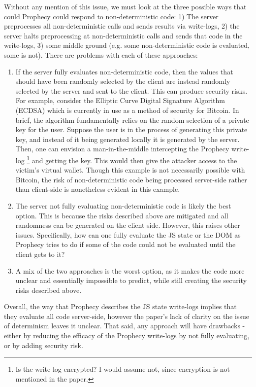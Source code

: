 \documentclass[10pt,letterpaper]{article}
\begin{document}
\begin{multicols*}{2}[]
            Without any mention of this issue, we must look at the three possible ways that could Prophecy could respond to non-deterministic code: 1) The server preprocesses all non-deterministic calls and sends results via write-logs, 2) the server halts preprocessing at non-deterministic calls and sends that code in the write-logs, 3) some middle ground (e.g. some non-deterministic code is evaluated, some is not). There are problems with each of these approaches:
            \begin{enumerate}
                \item If the server fully evaluates non-deterministic code, then the values that should have been randomly selected by the client are instead randomly selected by the server and sent to the client. This can produce security risks. For example, consider the Elliptic Curve Digital Signature Algorithm (ECDSA) which is currently in use as a method of security for Bitcoin. In brief, the algorithm fundamentally relies on the random selection of a private key for the user. Suppose the user is in the process of generating this private key, and instead of it being generated locally it is generated by the server. Then, one can envision a man-in-the-middle intercepting the Prophecy write-log \footnote{Is the write log encrypted? I would assume not, since encryption is not mentioned in the paper.} and getting the key. This would then give the attacker access to the victim's virtual wallet. Though this example is not necessarily possible with Bitcoin, the risk of non-deterministic code being processed server-side rather than client-side is nonetheless evident in this example. 
                \item The server not fully evaluating non-deterministic code is likely the best option. This is because the risks described above are mitigated and all randomness can be generated on the client side. However, this raises other issues. Specifically, how can one fully evaluate the JS state or the DOM as Prophecy tries to do if some of the code could not be evaluated until the client gets to it?
                \item A mix of the two approaches is the worst option, as it makes the code more unclear and essentially impossible to predict, while still creating the security risks described above.
            \end{enumerate}

            Overall, the way that Prophecy describes the JS state write-logs implies that they evaluate all code server-side, however the paper's lack of clarity on the issue of determinism leaves it unclear. That said, any approach will have drawbacks - either by reducing the efficacy of the Prophecy write-logs by not fully evaluating, or by adding security risk.

\end{multicols*}
\end{document}
